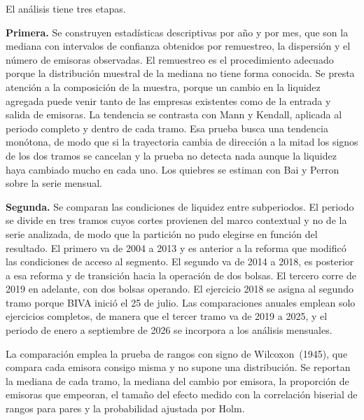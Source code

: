
El análisis tiene tres etapas.

\textbf{Primera.} Se construyen estadísticas descriptivas por año y por mes, que son la mediana con intervalos de confianza obtenidos por remuestreo, la dispersión y el número de emisoras observadas. El remuestreo es el procedimiento adecuado porque la distribución muestral de la mediana no tiene forma conocida. Se presta atención a la composición de la muestra, porque un cambio en la liquidez agregada puede venir tanto de las empresas existentes como de la entrada y salida de emisoras. La tendencia se contrasta con Mann y Kendall, aplicada al periodo completo y dentro de cada tramo. Esa prueba busca una tendencia monótona, de modo que si la trayectoria cambia de dirección a la mitad los signos de los dos tramos se cancelan y la prueba no detecta nada aunque la liquidez haya cambiado mucho en cada uno. Los quiebres se estiman con Bai y Perron sobre la serie mensual.

\textbf{Segunda.} Se comparan las condiciones de liquidez entre subperiodos. El periodo se divide en tres tramos cuyos cortes provienen del marco contextual y no de la serie analizada, de modo que la partición no pudo elegirse en función del resultado. El primero va de 2004 a 2013 y es anterior a la reforma que modificó las condiciones de acceso al segmento. El segundo va de 2014 a 2018, es posterior a esa reforma y de transición hacia la operación de dos bolsas. El tercero corre de 2019 en adelante, con dos bolsas operando. El ejercicio 2018 se asigna al segundo tramo porque BIVA inició el 25 de julio. Las comparaciones anuales emplean solo ejercicios completos, de manera que el tercer tramo va de 2019 a 2025, y el periodo de enero a septiembre de 2026 se incorpora a los análisis mensuales.

La comparación emplea la prueba de rangos con signo de Wilcoxon~(1945), que compara cada emisora consigo misma y no supone una distribución. Se reportan la mediana de cada tramo, la mediana del cambio por emisora, la proporción de emisoras que empeoran, el tamaño del efecto medido con la correlación biserial de rangos para pares y la probabilidad ajustada por Holm.

